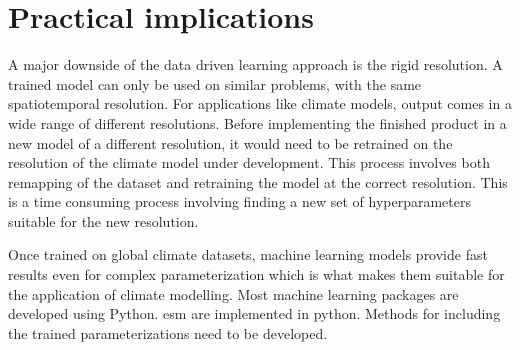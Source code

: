 \section{Practical implications} \label{sec:practical_implications}

A major downside of the data driven learning approach is the rigid resolution. A trained model can only be used on similar problems, with the same spatiotemporal resolution. For applications like climate models, output comes in a wide range of different resolutions. Before implementing the finished product in a new model of a different resolution, it would need to be retrained on the resolution of the climate model under development. This process involves both remapping of the dataset and retraining the model at the correct resolution. This is a time consuming process involving finding a new set of hyperparameters suitable for the new resolution. %

Once trained on global climate datasets, machine learning models provide fast results even for complex parameterization which is what makes them suitable for the application of climate modelling. Most machine learning packages are developed using Python. \acrfull{esm} are implemented in python. Methods for including the trained parameterizations need to be developed.
 